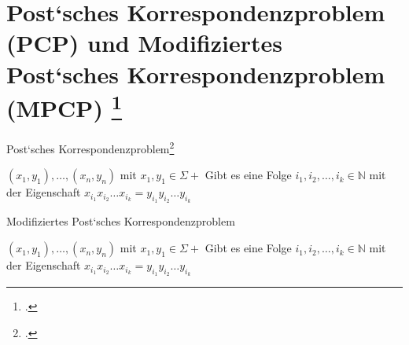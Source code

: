 \documentclass{bschlangaul-aufgabe}
\begin{document}
\section{Post‘sches Korrespondenzproblem (PCP) und Modifiziertes Post‘sches Korrespondenzproblem (MPCP)
\footcite[Seite 46-48]{theo:fs:4}}

Post‘sches Korrespondenzproblem\footcite[Seite 326-330]{hoffmann}

{$(x_1, y_1), \dots, (x_n, y_n)$ mit $x_1, y_1 \in \Sigma +$}
{Gibt es eine Folge $i_1, i_2, \dots, i_k \in \mathbb{N}$ mit der Eigenschaft
$x_{i_1} x_{i_2} \dots x_{i_k} = y_{i_1} y_{i_2} \dots y_{i_k}$}

Modifiziertes Post‘sches Korrespondenzproblem

{$(x_1, y_1), \dots, (x_n, y_n)$ mit $x_1, y_1 \in \Sigma +$}
{Gibt es eine Folge $i_1, i_2, \dots, i_k \in \mathbb{N}$ mit der Eigenschaft
$x_{i_1} x_{i_2} \dots x_{i_k} = y_{i_1} y_{i_2} \dots y_{i_k}$}
\end{document}

